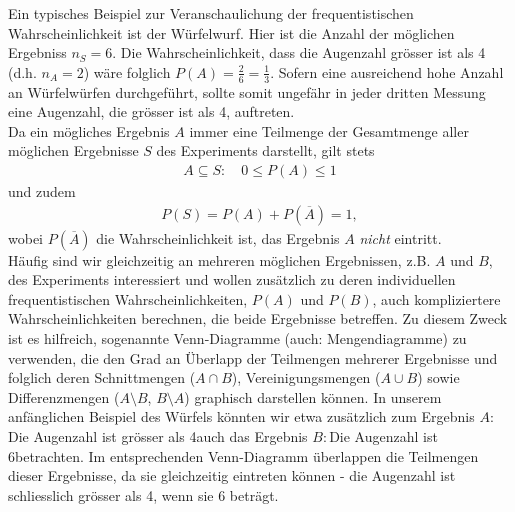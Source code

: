 Ein typisches Beispiel zur Veranschaulichung der frequentistischen Wahrscheinlichkeit ist der Würfelwurf. Hier ist die Anzahl der möglichen Ergebniss $n_S=6$. Die Wahrscheinlichkeit, dass die Augenzahl grösser ist als 4 (d.h. $n_A = 2$) wäre folglich $P(A)=\frac{2}{6}=\frac{1}{3}$. Sofern eine ausreichend hohe Anzahl an Würfelwürfen durchgeführt, sollte somit ungefähr in jeder dritten Messung eine Augenzahl, die grösser ist als 4, auftreten. \\

Da ein mögliches Ergebnis $A$ immer eine Teilmenge der Gesamtmenge aller möglichen Ergebnisse $S$ des Experiments darstellt, gilt  stets
\begin{align}
A \subseteq S:  \quad 0 \leq P ( A ) \leq 1
\end{align}
und zudem
\begin{align}
P(S) =  P(A) + P(\overline{A}) =  1,
\end{align}
wobei $P(\overline{A})$ die Wahrscheinlichkeit ist, das Ergebnis $A$ \textit{nicht} eintritt. \\

Häufig sind wir gleichzeitig an mehreren möglichen Ergebnissen, z.B. $A$ und $B$, des Experiments interessiert und wollen zusätzlich zu deren individuellen frequentistischen Wahrscheinlichkeiten, $P(A)$ und $P(B)$, auch kompliziertere Wahrscheinlichkeiten berechnen, die beide Ergebnisse betreffen. Zu diesem Zweck ist es hilfreich, sogenannte Venn-Diagramme (auch: Mengendiagramme) zu verwenden, die den Grad an Überlapp der Teilmengen mehrerer Ergebnisse und folglich deren Schnittmengen ($A\cap B$), Vereinigungsmengen ($A \cup B$) sowie Differenzmengen ($A\setminus B $, $B \setminus A$)  graphisch darstellen können. In unserem anfänglichen Beispiel des Würfels könnten wir etwa zusätzlich zum Ergebnis $A:$\glqq Die Augenzahl ist grösser als 4\grqq auch das Ergebnis $B:$\glqq Die Augenzahl ist 6\grqq betrachten. Im entsprechenden Venn-Diagramm überlappen die Teilmengen dieser Ergebnisse, da sie gleichzeitig eintreten können - die Augenzahl ist schliesslich grösser als 4, wenn sie 6 beträgt. 

